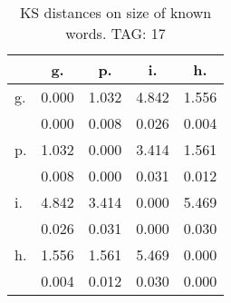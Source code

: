 \begin{table}[h!]
\begin{center}
\begin{tabular}{| l | c | c | c | c |}\hline
 & g. & p. & i. & h. \\\hline
g. & 0.000  & 1.032  & 4.842  & 1.556 \\\hline
 & 0.000  & 0.008  & 0.026  & 0.004 \\\hline
p. & 1.032  & 0.000  & 3.414  & 1.561 \\\hline
 & 0.008  & 0.000  & 0.031  & 0.012 \\\hline
i. & 4.842  & 3.414  & 0.000  & 5.469 \\\hline
 & 0.026  & 0.031  & 0.000  & 0.030 \\\hline
h. & 1.556  & 1.561  & 5.469  & 0.000 \\\hline
 & 0.004  & 0.012  & 0.030  & 0.000 \\\hline
\end{tabular}
\caption{KS distances on size of known words. TAG: 17}
\end{center}
\end{table}